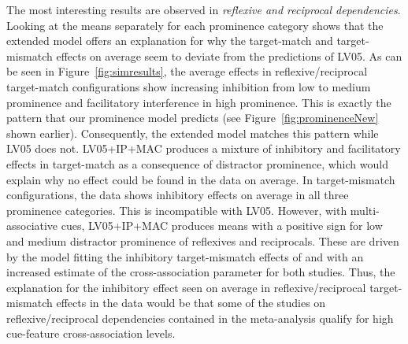 \documentclass{cambridge7A}\usepackage[]{graphicx}\usepackage[]{color}
\begin{document}
The most interesting results are observed in  \emph{reflexive and reciprocal dependencies}. 
Looking at the means separately for each prominence category shows that the extended model offers an explanation for why the target-match and target-mismatch effects on average seem to deviate from the predictions of LV05.
As can be seen in Figure~\ref{fig:simresults}, the average effects in reflexive/reciprocal target-match configurations show increasing inhibition from low to medium prominence and facilitatory interference in high prominence. This is exactly the pattern that our prominence model predicts (see Figure~\ref{fig:prominenceNew} shown earlier). Consequently, the extended model matches this pattern while LV05 does not.
LV05+IP+MAC produces a mixture of inhibitory and facilitatory effects in target-match as a consequence of distractor prominence, which would explain why no effect could be found in the data on average.
In target-mismatch configurations, the data shows inhibitory effects on average in all three prominence categories. This is incompatible with LV05. 
However, with multi-associative cues, LV05+IP+MAC produces means with a positive sign for low and medium distractor prominence of reflexives and reciprocals. These are driven by the model fitting the inhibitory target-mismatch effects of \cite{KushPhillips2014} and \cite{JaegerEngelmannVasishth2015} with an increased estimate of the cross-association parameter for both studies. 
Thus, the explanation for the inhibitory effect seen on average in reflexive/reciprocal target-mismatch effects in the data would be that some of the studies on reflexive/reciprocal dependencies contained in the meta-analysis qualify for high cue-feature cross-association levels.
\end{document}
